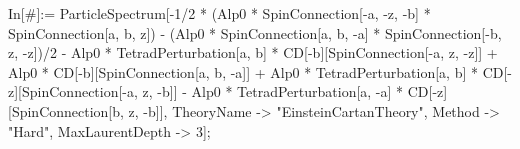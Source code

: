 In[#]:= ParticleSpectrum[-1/2 * (Alp0 * SpinConnection[-a, -z, -b] * SpinConnection[a, b, z]) - (Alp0 * SpinConnection[a, b, -a] * SpinConnection[-b, z, -z])/2 - Alp0 * TetradPerturbation[a, b] * CD[-b][SpinConnection[-a, z, -z]] + Alp0 * CD[-b][SpinConnection[a, b, -a]] + Alp0 * TetradPerturbation[a, b] * CD[-z][SpinConnection[-a, z, -b]] - Alp0 * TetradPerturbation[a, -a] * CD[-z][SpinConnection[b, z, -b]], TheoryName -> "EinsteinCartanTheory", Method -> "Hard", MaxLaurentDepth -> 3]; 
